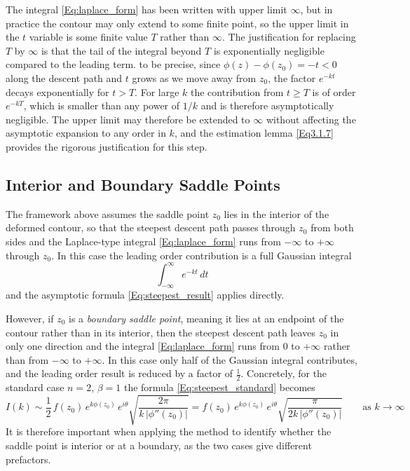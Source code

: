 The integral \eqref{Eq:laplace_form} has been written with upper limit $\infty$, but in practice the contour may only extend to some finite point, so the upper limit in the $t$ variable is some finite value $T$ rather than $\infty$. The justification for replacing $T$ by $\infty$ is that the tail of the integral beyond $T$ is exponentially negligible compared to the leading term. to be precise, since $\phi(z) - \phi(z_0) = -t < 0$ along the descent path and $t$ grows as we move away from $z_0$, the factor $e^{-kt}$ decays exponentially for $t > T$. For large $k$ the contribution from $t \geq T$ is of order $e^{-kT}$, which is smaller than any power of $1/k$ and is therefore asymptotically negligible. The upper limit may therefore be extended to $\infty$ without affecting the asymptotic expansion to any order in $k$, and the estimation lemma \ref{Eq3.1.7} provides the rigorous justification for this step.

\subsection{Interior and Boundary Saddle Points}

The framework above assumes the saddle point $z_0$ lies in the interior of the deformed contour, so that the steepest descent path passes through $z_0$ from both sides and the Laplace-type integral \eqref{Eq:laplace_form} runs from $-\infty$ to $+\infty$ through $z_0$. In this case the leading order contribution is a full Gaussian integral$$\int_{-\infty}^{\infty} e^{-kt}\,dt$$and the asymptotic formula \eqref{Eq:steepest_result} applies directly.

However, if $z_0$ is a \textit{boundary saddle point}, meaning it lies at an endpoint of the contour rather than in its interior, then the steepest descent path leaves $z_0$ in only one direction and the integral \eqref{Eq:laplace_form} runs from $0$ to $+\infty$ rather than from $-\infty$ to $+\infty$. In this case only half of the Gaussian integral contributes, and the leading order result is reduced by a factor of $\frac{1}{2}$. Concretely, for the standard case $n = 2$, $\beta = 1$ the formula \eqref{Eq:steepest_standard} becomes
\begin{equation}\label{Eq:steepest_boundary}
    I(k) \sim \frac{1}{2}\,f(z_0)\,e^{k\phi(z_0)}\,e^{i\theta}
    \sqrt{\frac{2\pi}{k\,|\phi''(z_0)|}}
    = f(z_0)\,e^{k\phi(z_0)}\,e^{i\theta}
    \sqrt{\frac{\pi}{2k\,|\phi''(z_0)|}}
    \qquad \text{as } k \to \infty
\end{equation}
It is therefore important when applying the method to identify whether the saddle point is interior or at a boundary, as the two cases give different prefactors. \cite{olver1997,bleistein1986}

